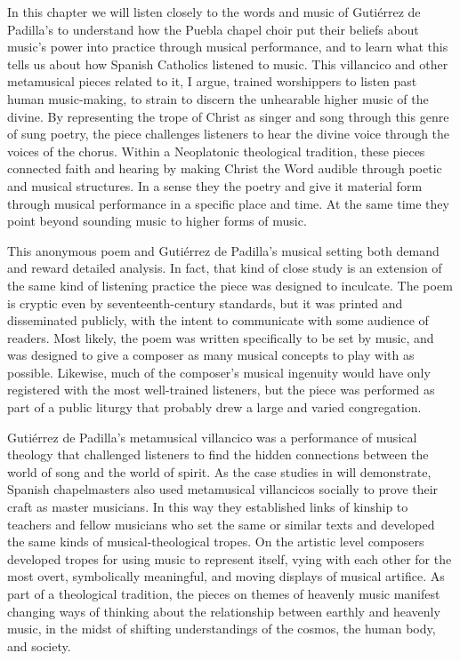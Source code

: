 
In this chapter we will listen closely to the words and music of Gutiérrez de
Padilla's  to understand how the Puebla chapel
choir put their beliefs about music's power into practice through musical
performance, and to learn what this tells us about how Spanish Catholics
listened to music.
This villancico and other metamusical pieces related to it, I argue, trained
worshippers to listen past human music-making, to strain to discern the unhearable
higher music of the divine.
By representing the trope of Christ as singer and song through this genre of
sung poetry, the piece challenges listeners to hear the divine voice through the
voices of the chorus.
Within a Neoplatonic theological tradition, these pieces connected faith and
hearing by making Christ the Word audible through poetic and musical structures.
In a sense they  the poetry and give it material form through
musical performance in a specific place and time.
At the same time they point beyond sounding music to higher forms of music.


This anonymous poem and Gutiérrez de Padilla's musical setting both demand and
reward detailed analysis.
In fact, that kind of close study is an extension of the same kind of listening
practice the piece was designed to inculcate.
The poem is cryptic even by seventeenth-century standards, but it was printed
and disseminated publicly, with the intent to communicate with some audience of
readers.
Most likely, the poem was written specifically to be set by music, and was
designed to give a composer as many musical concepts to play with as possible.
Likewise, much of the composer's musical ingenuity would have only registered
with the most well-trained listeners, but the piece was performed as part of a
public liturgy that probably drew a large and varied congregation.

Gutiérrez de Padilla's metamusical villancico was a performance of musical
theology that challenged listeners to find the hidden connections between the
world of song and the world of spirit.
As the case studies in  will demonstrate, Spanish
chapelmasters also used metamusical villancicos socially to prove their craft
as master musicians.
In this way they established links of kinship to teachers and fellow musicians
who set the same or similar texts and developed the same kinds of
musical-theological tropes.
On the artistic level composers developed tropes for using music to represent
itself, vying with each other for the most overt, symbolically meaningful, and
moving displays of musical artifice.
As part of a theological tradition, the pieces on themes of heavenly music
manifest changing ways of thinking about the relationship between earthly and
heavenly music, in the midst of shifting understandings of the cosmos, the
human body, and society.

